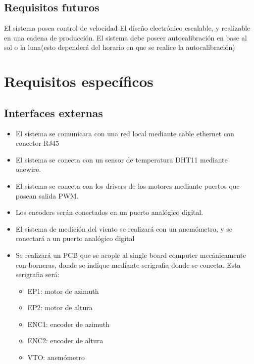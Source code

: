 \documentclass[12pt,a4paper, twosite]{article}
\begin{document}
	
	\subsection{Requisitos futuros}
	\label{sec:org33cfcdb}
	El sistema posea control de velocidad 
	El diseño electrónico escalable, y realizable en una cadena de producción.  
	El sistema debe poseer autocalibración en base al sol o la luna(esto dependerá del horario en que se realice la autocalibración) 
	
	
	
	
	\section{Requisitos específicos}
	\label{sec:org40573d1}
	
	
	\subsection{Interfaces externas}
	\label{sec:orgfd5391f}
	\begin{itemize}
		\item El sistema se comunicara con una red local mediante cable ethernet con conector RJ45
		\item El sistema se conecta con un sensor de temperatura DHT11 mediante onewire. 
		\item El sistema se conecta con los drivers de los motores mediante puertos que posean salida PWM. 
		\item Los encoders serán conectados en un puerto analógico digital. 
		\item El sistema de medición del viento se realizará con un anemómetro, y se conectará a un puerto analógico digital
		\item Se realizará un PCB que se acople al single board computer mecánicamente con borneras, donde se indique mediante serigrafia donde se conecta. Esta serigrafia será: 
		\begin{itemize}
			\item EP1: motor de azimuth 
			\item EP2: motor de altura
			\item ENC1: encoder de azimuth 
			\item ENC2: encoder de altura 
			\item VTO: anemómetro 
			
		\end{itemize} 
		
	\end{itemize}
	
\end{document}
